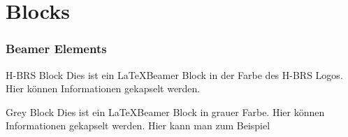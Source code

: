 \section{Blocks}
    \begin{frame}
        \frametitle{Beamer Elements}
        
        \begin{hbrsblock}{H-BRS Block}
            Dies ist ein \LaTeX Beamer Block in der Farbe des H-BRS Logos. Hier können Informationen gekapselt werden.
        \end{hbrsblock}
        
        \begin{greyblock}{Grey Block}
            Dies ist ein \LaTeX Beamer Block in grauer Farbe. Hier können Informationen gekapselt werden. Hier kann man zum Beispiel 
        \end{greyblock}
    \end{frame}